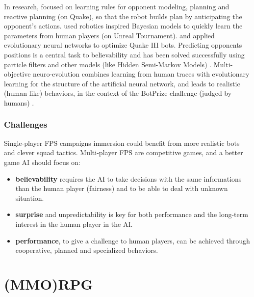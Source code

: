 In research, \citet{Laird01} focused on learning rules for opponent modeling, planning and reactive planning (on Quake), so that the robot builds plan by anticipating the opponent's actions. \citet{LeHy04,theseRonan} used robotics inspired Bayesian models to quickly learn the parameters from human players (on Unreal Tournament). \citet{Zanetti2004} and \citet{westraQ3} applied evolutionary neural networks to optimize Quake III bots. Predicting opponents positions is a central task to believability and has been solved successfully using particle filters \citep{particlefiltergameAI} and other models (like Hidden Semi-Markov Models) \citep{Hladky_anevaluation}. Multi-objective neuro-evolution \citep{Zanetti2004,schrum_cig11competition} combines learning from human traces with evolutionary learning for the structure of the artificial neural network, and leads to realistic (human-like) behaviors, in the context of the BotPrize challenge (judged by humans) \citep{Hingston_2009}.

\subsubsection{Challenges}

Single-player FPS campaigns immersion could benefit from more realistic bots and clever squad tactics. Multi-player FPS are competitive games, and a better game AI should focus on:
\begin{itemize}
    \item \textbf{believability} requires the AI to take decisions with the same informations than the human player (fairness) and to be able to deal with unknown situation.
    \item \textbf{surprise} and {unpredictability} is key for both performance and the long-term interest in the human player in the AI.
    \item \textbf{performance}, to give a challenge to human players, can be achieved through cooperative, planned and specialized behaviors.
\end{itemize}


\section{(MMO)RPG}

\label{sec:MMORPG}

